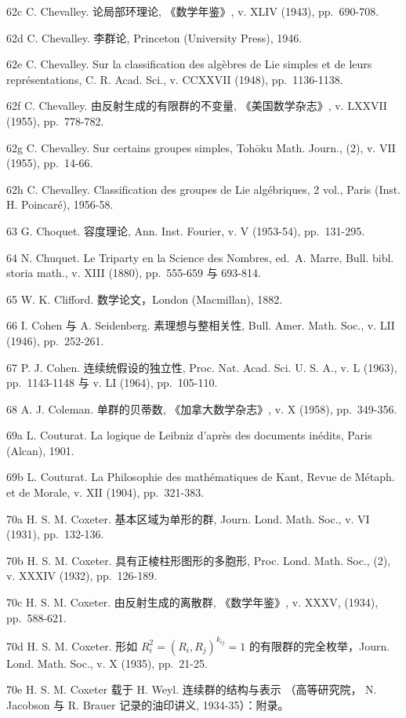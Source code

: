 62c C. Chevalley. 论局部环理论, 《数学年鉴》, v. XLIV (1943), pp.~690-708.

62d C. Chevalley. 李群论, Princeton (University Press), 1946.

62e C. Chevalley. Sur la classification des algèbres de Lie simples et de leurs représentations, C. R. Acad. Sci., v. CCXXVII (1948), pp.~1136-1138.

62f C. Chevalley. 由反射生成的有限群的不变量, 《美国数学杂志》, v. LXXVII (1955), pp.~778-782.

62g C. Chevalley. Sur certains groupes simples, Tohōku Math. Journ., (2), v. VII (1955), pp.~14-66.

62h C. Chevalley. Classification des groupes de Lie algébriques, 2 vol., Paris (Inst. H. Poincaré), 1956-58.

63 G. Choquet. 容度理论, Ann. Inst. Fourier, v. V (1953-54), pp.~131-295.

64 N. Chuquet. Le Triparty en la Science des Nombres, ed.~A. Marre, Bull. bibl. storia math., v. XIII (1880), pp.~555-659 与 693-814.

65 W. K. Clifford. 数学论文，London (Macmillan), 1882.

66 I. Cohen 与 A. Seidenberg. 素理想与整相关性, Bull. Amer. Math. Soc., v. LII (1946), pp.~252-261.

67 P. J. Cohen. 连续统假设的独立性, Proc. Nat. Acad. Sci. U. S. A., v. L (1963), pp.~1143-1148 与 v. LI (1964), pp.~105-110.

68 A. J. Coleman. 单群的贝蒂数, 《加拿大数学杂志》, v. X (1958), pp.~349-356.

69a L. Couturat. La logique de Leibniz d'après des documents inédits, Paris (Alcan), 1901.

69b L. Couturat. La Philosophie des mathématiques de Kant, Revue de Métaph. et de Morale, v. XII (1904), pp.~321-383.

70a H. S. M. Coxeter. 基本区域为单形的群, Journ. Lond. Math. Soc., v. VI (1931), pp.~132-136.

70b H. S. M. Coxeter. 具有正棱柱形图形的多胞形, Proc. Lond. Math. Soc., (2), v. XXXIV (1932), pp.~126-189.

70c H. S. M. Coxeter. 由反射生成的离散群, 《数学年鉴》, v. XXXV, (1934), pp.~588-621.

70d H. S. M. Coxeter. 形如 \(R_{i}^{2} = (R_{i}, R_{j})^{k_{ij}} = 1\) 的有限群的完全枚举，Journ. Lond. Math. Soc., v. X (1935), pp.~21-25.

70e H. S. M. Coxeter 载于 H. Weyl. 连续群的结构与表示 （高等研究院， N. Jacobson 与 R. Brauer 记录的油印讲义, 1934-35）：附录。

